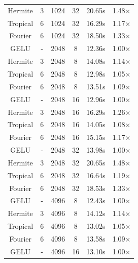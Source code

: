 \documentclass{article} %
\theoremstyle{plain}
\theoremstyle{definition}
\theoremstyle{remark}
\begin{document}
\begin{table}[!htbp]
\begin{center}
\begin{small}
\begin{tabular}{cccccc}
 Hermite      & 3        &    1024 &      32 & 20.65s          & 1.48×                  \\
 Tropical     & 6        &    1024 &      32 & 16.29s          & 1.17×                  \\
 Fourier      & 6        &    1024 &      32 & 18.50s          & 1.33×                  \\
 \midrule
 GELU         & -        &    2048 &       8 & 12.36s          & 1.00×                  \\
 Hermite      & 3        &    2048 &       8 & 14.08s          & 1.14×                  \\
 Tropical     & 6        &    2048 &       8 & 12.98s          & 1.05×                  \\
 Fourier      & 6        &    2048 &       8 & 13.51s          & 1.09×                  \\
 \midrule
 GELU         & -        &    2048 &      16 & 12.96s          & 1.00×                  \\
 Hermite      & 3        &    2048 &      16 & 16.29s          & 1.26×                  \\
 Tropical     & 6        &    2048 &      16 & 14.05s          & 1.08×                  \\
 Fourier      & 6        &    2048 &      16 & 15.15s          & 1.17×                  \\
 \midrule
 GELU         & -        &    2048 &      32 & 13.98s          & 1.00×                  \\
 Hermite      & 3        &    2048 &      32 & 20.65s          & 1.48×                  \\
 Tropical     & 6        &    2048 &      32 & 16.64s          & 1.19×                  \\
 Fourier      & 6        &    2048 &      32 & 18.53s          & 1.33×                  \\
 \midrule
 GELU         & -        &    4096 &       8 & 12.43s          & 1.00×                  \\
 Hermite      & 3        &    4096 &       8 & 14.12s          & 1.14×                  \\
 Tropical     & 6        &    4096 &       8 & 13.02s          & 1.05×                  \\
 Fourier      & 6        &    4096 &       8 & 13.58s          & 1.09×                  \\
 \midrule
 GELU         & -        &    4096 &      16 & 13.10s          & 1.00×                  \\

\end{tabular}
\end{small}
\end{center}
\end{table}
\end{document}
